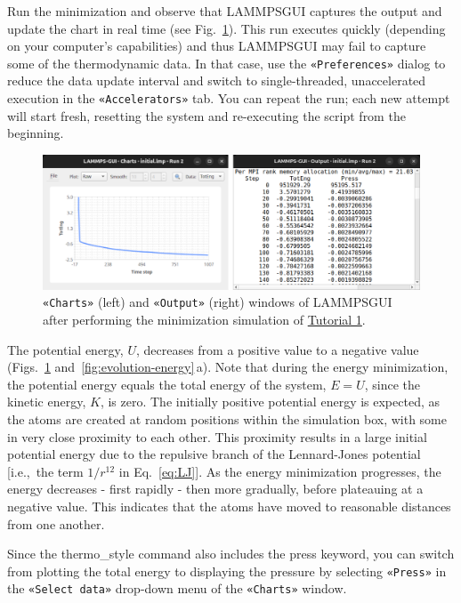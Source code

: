 \documentclass[9pt,tutorial]{livecoms}
\newcommand{\lmpcmd}[1]{\colorbox{listing}{\textcolor{command}{\small{#1}}}} %
\newcommand{\guicmd}[1]{\textcolor{command}{\texttt{«#1»}}} %
\newcommand{\lammpsgui}{\textsf{LAMMPS\textendash GUI}}
\begin{document}
Run the minimization and observe that \lammpsgui{} captures the output
and update the chart in real time (see Fig.~\ref{fig:chart-log}).  This
run executes quickly (depending on your computer's capabilities)
and thus \lammpsgui{} may fail to capture some of the
thermodynamic data.  In that case, use the \guicmd{Preferences} dialog
to reduce the data update interval and switch to single-threaded,
unaccelerated execution in the \guicmd{Accelerators} tab.  You can
repeat the run; each new attempt will start fresh, resetting the system
and re-executing the script from the beginning.

\begin{figure}
\centering
\includegraphics[width=\linewidth]{chart-and-output.png}
\caption{\guicmd{Charts} (left) and \guicmd{Output} (right) windows of \lammpsgui{}
  after performing the minimization simulation of \hyperref[lennard-jones-label]{Tutorial 1}.}
\label{fig:chart-log}
\end{figure}

The potential energy, $U$, decreases from a positive value to a negative value
(Figs.~\ref{fig:chart-log} and~\ref{fig:evolution-energy}\,a).  Note that
during the energy minimization, the potential energy equals the total energy
of the system, $E = U$, since the kinetic energy, $K$, is zero.  The
initially positive potential energy is expected, as the atoms are
created at random positions within the simulation box, with some in very
close proximity to each other.  This proximity results in a large
initial potential energy due to the repulsive branch of the
Lennard-Jones potential [i.e.,~the term $1/r^{12}$ in
Eq.~\eqref{eq:LJ}].  As the energy minimization progresses, the energy
decreases - first rapidly - then more gradually, before plateauing at a
negative value.  This indicates that the atoms have moved to reasonable
distances from one another.

\begin{note}
  Since the \lmpcmd{thermo\_style} command also includes the \lmpcmd{press}
  keyword, you can switch from plotting the total energy to
  displaying the pressure by selecting \guicmd{Press} in the \guicmd{Select data}
  drop-down menu of the \guicmd{Charts} window.
\end{note}
\end{document}
